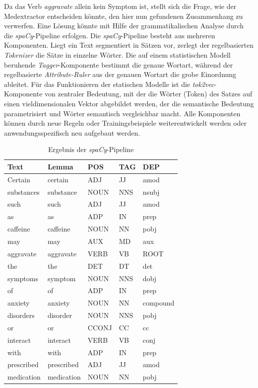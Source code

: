 Da das Verb \emph{aggravate} allein kein Symptom ist, stellt sich die Frage, wie der Medextractor entscheiden könnte, den hier nun gefundenen Zusammenhang zu verwerfen. Eine Lösung könnte mit Hilfe der grammatikalischen Analyse durch die \emph{spaCy}-Pipeline erfolgen. Die \emph{spaCy}-Pipeline besteht aus mehreren Komponenten. Liegt ein Text segmentiert in Sätzen vor, zerlegt der regelbasierten \emph{Tokenizer} die Sätze in einzelne Wörter. Die auf einem statistischen Modell beruhende \emph{Tagger}-Komponente bestimmt die genaue Wortart, während der regelbasierte \emph{Attribute-Ruler} aus der genauen Wortart die grobe Einordnung ableitet. Für das Funktionieren der statischen Modelle ist die \emph{tok2vec}-Komponente von zentraler Bedeutung, mit der die Wörter (Token) des Satzes auf einen vieldimensionalen Vektor abgebildet werden, der die semantische Bedeutung parametrisiert und Wörter semantisch vergleichbar macht. Alle Komponenten können durch neue Regeln oder Trainingsbeispiele weiterentwickelt werden oder anwendungsspezifisch neu aufgebaut werden. 

\begin{table}
\centering
\begin{tabular}{lllll}
\hline
\textbf{Text}	& \textbf{Lemma}	& \textbf{POS} & \textbf{TAG} & \textbf{DEP} \\
\hline
Certain & certain & ADJ & JJ & amod \\
substances & substance & NOUN & NNS & nsubj \\
such & such & ADJ & JJ & amod \\
as & as & ADP & IN & prep \\
caffeine & caffeine & NOUN & NN & pobj \\
may & may & AUX & MD & aux \\
aggravate & aggravate & VERB & VB & ROOT \\
the & the & DET & DT & det \\
symptoms & symptom & NOUN & NNS & dobj \\
of & of & ADP & IN & prep \\
anxiety & anxiety & NOUN & NN & compound \\
disorders & disorder & NOUN & NNS & pobj \\
or & or & CCONJ & CC & cc \\
interact & interact & VERB & VB & conj \\
with & with & ADP & IN & prep \\
prescribed & prescribed & ADJ & JJ & amod \\
medication & medication & NOUN & NN & pobj \\
\hline
\end{tabular}
\caption{Ergebnis der \emph{spaCy}-Pipeline}
\label{tab:spaCy}
\end{table}

